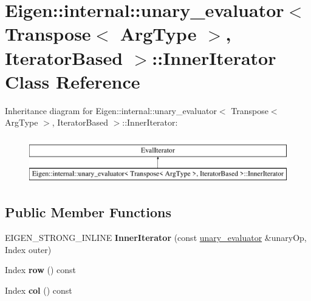 \hypertarget{class_eigen_1_1internal_1_1unary__evaluator_3_01_transpose_3_01_arg_type_01_4_00_01_iterator_based_01_4_1_1_inner_iterator}{}\section{Eigen\+::internal\+::unary\+\_\+evaluator$<$ Transpose$<$ Arg\+Type $>$, Iterator\+Based $>$\+::Inner\+Iterator Class Reference}
\label{class_eigen_1_1internal_1_1unary__evaluator_3_01_transpose_3_01_arg_type_01_4_00_01_iterator_based_01_4_1_1_inner_iterator}
Inheritance diagram for Eigen\+::internal\+::unary\+\_\+evaluator$<$ Transpose$<$ Arg\+Type $>$, Iterator\+Based $>$\+::Inner\+Iterator\+:\begin{figure}[H]
\begin{center}
\leavevmode
\includegraphics[height=2.000000cm]{class_eigen_1_1internal_1_1unary__evaluator_3_01_transpose_3_01_arg_type_01_4_00_01_iterator_based_01_4_1_1_inner_iterator}
\end{center}
\end{figure}
\subsection*{Public Member Functions}
\begin{DoxyCompactItemize}
\item 
\mbox{\label{class_eigen_1_1internal_1_1unary__evaluator_3_01_transpose_3_01_arg_type_01_4_00_01_iterator_based_01_4_1_1_inner_iterator_a9579815df5f7f07ad8baf85c5a6e2f51}} 
E\+I\+G\+E\+N\+\_\+\+S\+T\+R\+O\+N\+G\+\_\+\+I\+N\+L\+I\+NE {\bfseries Inner\+Iterator} (const \mbox{\hyperlink{struct_eigen_1_1internal_1_1unary__evaluator}{unary\+\_\+evaluator}} \&unary\+Op, Index outer)
\item 
\mbox{\label{class_eigen_1_1internal_1_1unary__evaluator_3_01_transpose_3_01_arg_type_01_4_00_01_iterator_based_01_4_1_1_inner_iterator_ac32dec3e3a1e51fa1cd6409c3dbcc2a7}} 
Index {\bfseries row} () const
\item 
\mbox{\label{class_eigen_1_1internal_1_1unary__evaluator_3_01_transpose_3_01_arg_type_01_4_00_01_iterator_based_01_4_1_1_inner_iterator_a136cadb972e0d183cc055f1dff43d9ee}} 
Index {\bfseries col} () const
\end{DoxyCompactItemize}


